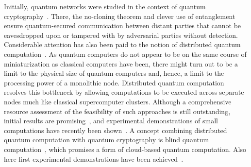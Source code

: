 Initially, quantum networks were studied in the context of quantum cryptography~\cite{Bennett1984,Ekert1991,Deutsch1996,Gisin2002}.
There, the no-cloning theorem and clever use of entanglement ensure quantum-secured communication between distant parties that cannot be eavesdropped upon or tampered with by adversarial parties without detection.
Considerable attention has also been paid to the notion of distributed quantum computation~\cite{Cirac1999}.
As quantum computers do not appear to be on the same course of miniaturization as classical computers have been, there might turn out to be a limit to the physical size of quantum computers and, hence, a limit to the processing power of a monolithic node.
Distributed quantum computation resolves this bottleneck by allowing computations to be executed across separate nodes much like classical supercomputer clusters.
Although a comprehensive resource assessment of the feasibility of such approaches is still outstanding, initial results are promising~\cite{Jacinto2025}, and experimental demonstrations of small computations have recently been shown~\cite{Main2025}.
A concept combining distributed quantum computation with quantum cryptography is blind quantum computation~\cite{Childs2005,Giovannetti2013}, which promises a form of cloud-based quantum computation.
Also here first experimental demonstrations have been achieved~\cite{Wei2025}.

